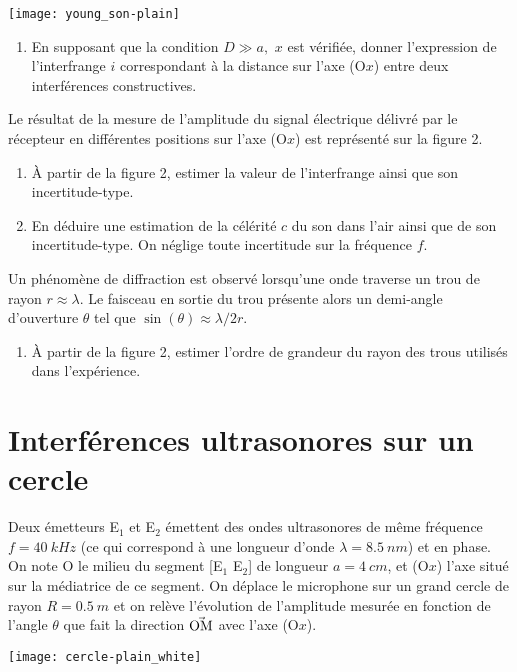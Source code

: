 \documentclass[a4paper, 12pt, final, garamond]{book}
\begin{document}
\begin{center}
    \texttt{[image: young\_son-plain]}
\end{center}

\begin{enumerate}
    \item En supposant que la condition $D \gg a,\,\,x$ est vérifiée, donner
        l'expression de l'interfrange $i$ correspondant à la distance sur l'axe
        (O$x$) entre deux interférences constructives.
\end{enumerate}
Le résultat de la mesure de l'amplitude du signal électrique délivré par le
récepteur en différentes positions sur l'axe (O$x$) est représenté sur la figure
2.
\begin{enumerate}[resume]
    \item À partir de la figure 2, estimer la valeur de l'interfrange ainsi que
        son incertitude-type.
    \item En déduire une estimation de la célérité $c$ du son dans l'air ainsi
        que de son incertitude-type. On néglige toute incertitude sur la
        fréquence $f$.
\end{enumerate}
Un phénomène de diffraction est observé lorsqu'une onde traverse un trou de
rayon $r \approx \lambda$. Le faisceau en sortie du trou présente alors un
demi-angle d'ouverture $\theta$ tel que $\sin(\theta) \approx \lambda/2r$.
\begin{enumerate}[resume]
    \item À partir de la figure 2, estimer l'ordre de grandeur du rayon des
        trous utilisés dans l'expérience.
\end{enumerate}

\section{Interférences ultrasonores sur un cercle}

\begin{minipage}{0.80\linewidth}
    Deux émetteurs E$_1$ et E$_2$ émettent des ondes ultrasonores de même
    fréquence $f = \SI{40}{kHz}$ (ce qui correspond à une longueur d'onde
    $\lambda = \SI{8.5}{nm}$) et en phase. On note O le milieu du segment [E$_1$
    E$_2$] de longueur $a = \SI{4}{cm}$, et (O$x$) l'axe situé sur la médiatrice
    de ce
    segment. On déplace le microphone sur un grand cercle de rayon $R =
    \SI{0.5}{m}$
    et on relève l'évolution de l'amplitude mesurée en fonction de l'angle
    $\theta$ que fait la direction $\vec{\rm OM}$ avec l'axe (O$x$).
\end{minipage}
\hfill
\begin{minipage}{0.20\linewidth}
    \begin{center}
        \texttt{[image: cercle-plain\_white]}
    \end{center}
\end{minipage}
\end{document}
